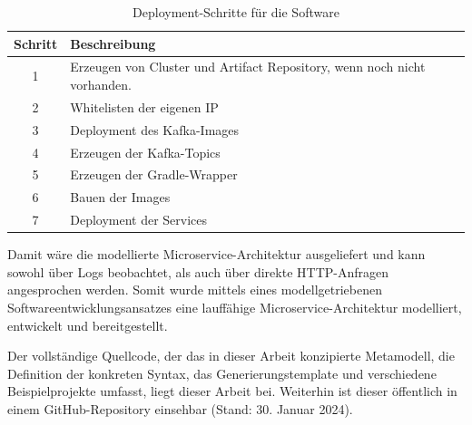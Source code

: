 \begin{table}[h]
\centering
\small
\begin{tabular}{|c|l|}
\hline
\textbf{Schritt} & \textbf{Beschreibung}                                      \\ \hline
1                & Erzeugen von Cluster und Artifact Repository, wenn noch nicht vorhanden.               \\ \hline
2                & Whitelisten der eigenen IP                                 \\ \hline
3                & Deployment des Kafka-Images                                \\ \hline
4                & Erzeugen der Kafka-Topics                                  \\ \hline
5                & Erzeugen der Gradle-Wrapper                                \\ \hline
6                & Bauen der Images                                           \\ \hline
7                & Deployment der Services                                    \\ \hline
\end{tabular}
\caption{Deployment-Schritte für die Software}
\label{tab:deployment_steps}
\end{table}

Damit wäre die modellierte Microservice-Architektur ausgeliefert und kann sowohl über Logs beobachtet, als auch über direkte HTTP-Anfragen angesprochen werden. Somit wurde mittels eines modellgetriebenen Softwareentwicklungsansatzes eine lauffähige Microservice-Architektur modelliert, entwickelt und bereitgestellt.

Der vollständige Quellcode, der das in dieser Arbeit konzipierte Metamodell, die Definition der konkreten Syntax, das Generierungstemplate und verschiedene Beispielprojekte umfasst, liegt dieser Arbeit bei. Weiterhin ist dieser öffentlich in einem GitHub-Repository \cite{github} einsehbar (Stand: 30. Januar 2024).
